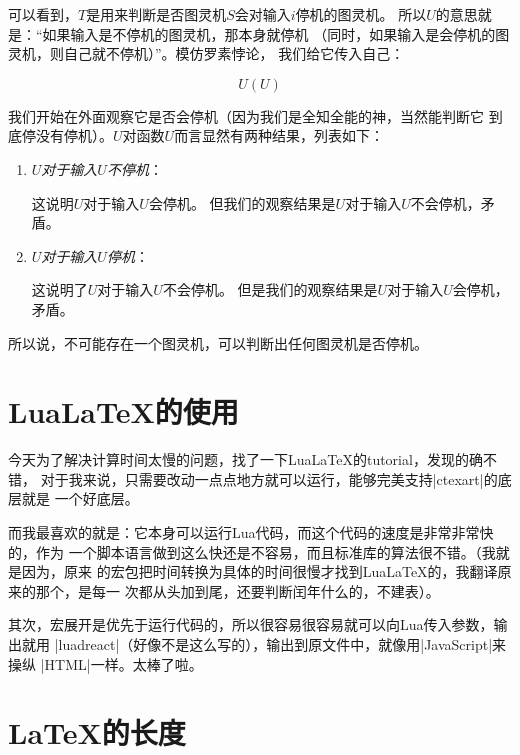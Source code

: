 可以看到，$T$是用来判断是否图灵机$S$会对输入$i$停机的图灵机。
所以$U$的意思就是：“如果输入是不停机的图灵机，那本身就停机
（同时，如果输入是会停机的图灵机，则自己就不停机）”。模仿罗素悖论，
我们给它传入自己：

$$U(U)$$

我们开始在外面观察它是否会停机（因为我们是全知全能的神，当然能判断它
到底停没有停机）。$U$对函数$U$而言显然有两种结果，列表如下：

\begin{enumerate}
    \item \emph{$U$对于输入$U$不停机}：\par
        这说明$U$对于输入$U$会停机。%
        \pltred 但我们的观察结果是$U$对于输入$U$不会停机，矛盾。\pltblack%
    \item \emph{$U$对于输入$U$停机}：\par
        这说明了$U$对于输入$U$不会停机。{\pltred%
        但是我们的观察结果是$U$对于输入$U$会停机，矛盾。}%
\end{enumerate}

所以说，不可能存在一个图灵机，可以判断出任何图灵机是否停机。



\section{Lua\LaTeX{}的使用}

今天为了解决计算时间太慢的问题，找了一下Lua\LaTeX{}的tutorial，发现的确不错，
对于我来说，只需要改动一点点地方就可以运行，能够完美支持\vb|ctexart|的底层就是
一个好底层。

而我最喜欢的就是：它本身可以运行Lua代码，而这个代码的速度是非常非常快的，作为
一个脚本语言做到这么快还是不容易，而且标准库的算法很不错。（我就是因为，原来
的宏包把时间转换为具体的时间很慢才找到Lua\LaTeX{}的，我翻译原来的那个，是每一
次都从头加到尾，还要判断闰年什么的，不建表）。

其次，宏展开是优先于运行代码的，所以很容易很容易就可以向Lua传入参数，输出就用%
\vb|luadreact|（好像不是这么写的），输出到原文件中，就像用\vb|JavaScript|来操纵%
\vb|HTML|一样。太棒了啦。


\section{\LaTeX{}的长度}

